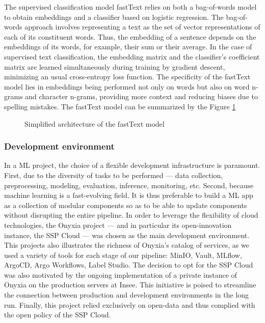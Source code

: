 The supervised classification model fastText relies on both a bag-of-words model to obtain embeddings and a classifier based on logistic regression. The bag-of-words approach involves representing a text as the set of vector representations of each of its constituent words. Thus, the embedding of a sentence depends on the embeddings of its words, for example, their sum or their average. In the case of supervised text classification, the embedding matrix and the classifier's coefficient matrix are learned simultaneously during training by gradient descent, minimizing an usual cross-entropy loss function. The specificity of the fastText model lies in embeddings being performed not only on words but also on word n-grams and character n-grams, providing more context and reducing biases due to spelling mistakes. The fastText model can be summarized by the Figure \ref{fig:fasttext}

\begin{figure}[htbp]
    \centering
    \caption{Simplified architecture of the fastText model}
    \label{fig:fasttext}
\end{figure}

\subsubsection{Development environment}

In a ML project, the choice of a flexible development infrastructure is paramount. First, due to the diversity of tasks to be performed — data collection, preprocessing, modeling, evaluation, inference, monitoring, etc. Second, because machine learning is a fast-evolving field. It is thus preferable to build a ML app as a collection of modular components so as to be able to update components without disrupting the entire pipeline. In order to leverage the flexibility of cloud technologies, the Onyxia project — and in particular its open-innovation instance, the SSP Cloud — was chosen as the main development environment. This projects also illustrates the richness of Onyxia's catalog of services, as we used a variety of tools for each stage of our pipeline: MinIO, Vault, MLflow, ArgoCD, Argo Workflows, Label Studio. The decision to opt for the SSP Cloud was also motivated by the ongoing implementation of a private instance of Onyxia on the production servers at Insee. This initiative is poised to streamline the connection between production and development environments in the long run. Finally, this project relied exclusively on open-data and thus complied with the open policy of the SSP Cloud.

